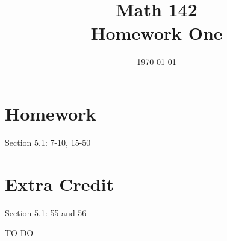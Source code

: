 \documentclass{exam}
\author{}
\date{\today}
\title{Math 142 \\ Homework One}
\begin{document}
  \maketitle

  \section{Homework}
  Section 5.1: 7-10, 15-50

  \section{Extra Credit}
  Section 5.1: 55 and 56

  \ifprintanswers
    \begin{solution}
      TO DO
    \end{solution}
  \fi

  \pagebreak

  \ifprintanswers
\end{document}
